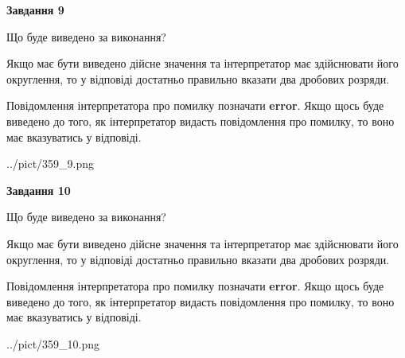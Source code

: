 \documentclass[12pt, ukrainian]{article}
\begin{document}
{\begin {Large}
{\begin {center}\textbf{Завдання 9}\end {center}}\par
Що буде виведено за виконання? \par

Якщо має бути виведено дійсне значення та інтерпретатор має здійснювати його округлення, 
то у відповіді достатньо правильно вказати два дробових розряди.

Повідомлення інтерпретатора про помилку позначати \textbf{error}.
Якщо щось буде виведено до того, як інтерпретатор видасть повідомлення про помилку, 
то воно має вказуватись у відповіді. \par

\begin{center}
	{../pict/359_9.png}
\end{center}
\newpage

{\begin {center}\textbf{Завдання 10}\end {center}}\par
Що буде виведено за виконання? \par

Якщо має бути виведено дійсне значення та інтерпретатор має здійснювати його округлення, 
то у відповіді достатньо правильно вказати два дробових розряди.

Повідомлення інтерпретатора про помилку позначати \textbf{error}.
Якщо щось буде виведено до того, як інтерпретатор видасть повідомлення про помилку, 
то воно має вказуватись у відповіді. \par

\begin{center}
	{../pict/359_10.png}
\end{center}
\newpage

\end {Large}}
\end{document}
